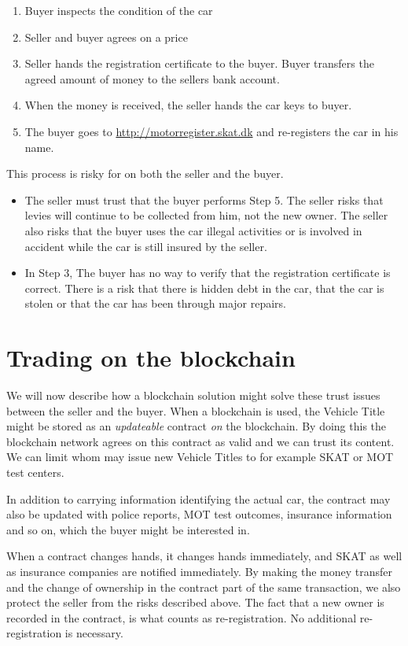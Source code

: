 \documentclass[oneside,a4paper,10pts,article]{memoir}
\begin{document}
\begin{enumerate}
\item Buyer inspects the condition of the car
\item Seller and buyer agrees on a price
\item Seller hands the registration certificate to the buyer. Buyer
  transfers the agreed amount of money to the sellers bank account.
\item When the money is received, the seller hands the car keys to buyer.
\item The buyer goes to \url{http://motorregister.skat.dk} and
  re-registers the car in his name.
\end{enumerate}
This process is risky for on both the seller and the buyer.
\begin{itemize}
\item The seller must trust that the buyer performs Step 5. The seller
  risks that levies will continue to be collected from him, not the
  new owner. The seller also risks that the buyer uses the car illegal
  activities or is involved in accident while the car is still insured
  by the seller.
\item In Step 3, The buyer has no way to verify that the registration
  certificate is correct. There is a risk that there is hidden debt in
  the car, that the car is stolen or that the car has been through
  major repairs.
\end{itemize}

\section{Trading on the blockchain}
\label{sec:trading_on_blockchain}
We will now describe how a blockchain solution might solve these trust
issues between the seller and the buyer. When a blockchain is used,
the Vehicle Title might be stored as an \emph{updateable} contract
\emph{on} the blockchain. By doing this the blockchain network agrees
on this contract as valid and we can trust its content. We can limit
whom may issue new Vehicle Titles to for example SKAT or MOT test
centers. 

In addition to carrying information identifying the actual car, the
contract may also be updated with police reports, MOT test outcomes,
insurance information and so on, which the buyer might be interested
in.

When a contract changes hands, it changes hands immediately, and SKAT
as well as insurance companies are notified immediately. By making the
money transfer and the change of ownership in the contract part of the
same transaction, we also protect the seller from the risks described
above. The fact that a new owner is recorded in the contract, is what
counts as re-registration. No additional re-registration is
necessary.
\end{document}
